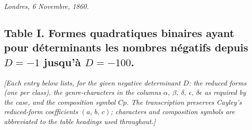 \documentclass[11pt,a4paper]{article}
\theoremstyle{plain}
\begin{document}
\medskip
\noindent\textit{Londres, 6 Novembre, 1860.}

\bigskip

\subsection*{Table I. Formes quadratiques binaires ayant pour d\'eterminants les nombres n\'egatifs depuis $D = -1$ jusqu'\`a $D = -100$.}

\medskip

\noindent\textit{[Each entry below lists, for the given negative determinant $D$: the reduced forms (one per class), the genre-characters in the columns $\alpha,\ \beta,\ \delta,\ \epsilon,\ \delta\epsilon$ as required by the case, and the composition symbol $Cp$. The transcription preserves Cayley's reduced-form coefficients $(a,\,b,\,c)$; characters and composition symbols are abbreviated to the table headings used throughout.]}
\end{document}
